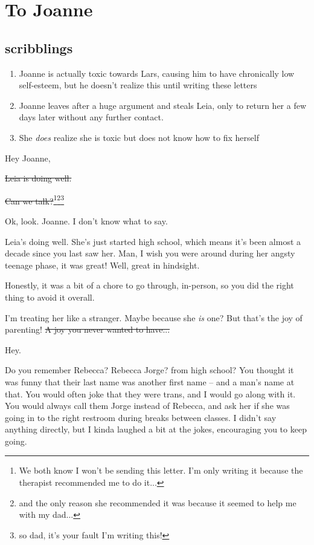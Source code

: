 \chapter{To Joanne}

\section*{scribblings}
\begin{enumerate}
\item Joanne is actually toxic towards Lars, causing him to have chronically low self-esteem, but he doesn't realize this until writing these letters
\item Joanne leaves after a huge argument and steals Leia, only to return her a few days later without any further contact.
\item She \textit{does} realize she is toxic but does not know how to fix herself
\end{enumerate}

Hey Joanne,

\sout{Leia is doing well.}

\sout{Can we talk?}\footnote{We both know I won't be sending this letter. I'm only writing it because the therapist recommended me to do it...}\footnote{and the only reason she recommended it was because it seemed to help me with my dad...}\footnote{so dad, it's your fault I'm writing this!}

Ok, look. Joanne.
I don't know what to say.

Leia's doing well.
She's just started high school, which means it's been almost a decade since you last saw her.
Man, I wish you were around during her angsty teenage phase, it was great!
Well, great in hindsight.

Honestly, it was a bit of a chore to go through, in-person, so you did the right thing to avoid it overall.

\begin{noteblock}{I'm treating her like a stranger. Maybe because she \textit{is} one?}
But that's the joy of parenting!
\sout{A joy you never wanted to have...}
\end{noteblock}

Hey.

Do you remember Rebecca? Rebecca Jorge? from high school?
You thought it was funny that their last name was another first name -- and a man's name at that.
You would often joke that they were trans, and I would go along with it.
You would always call them Jorge instead of Rebecca, and ask her if she was going in to the right restroom during breaks between classes.
I didn't say anything directly, but I kinda laughed a bit at the jokes, encouraging you to keep going.

